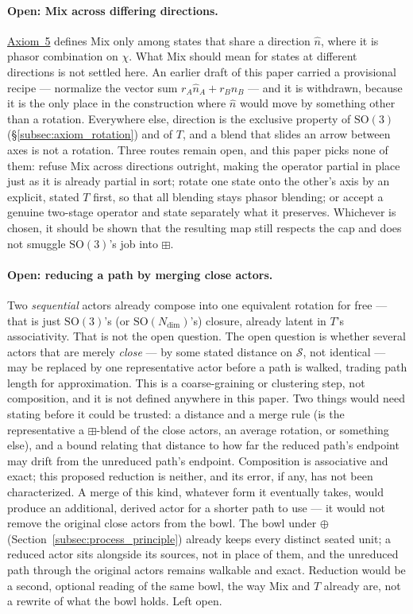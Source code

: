 \documentclass[12pt, a4paper]{article}
\begin{document}
\paragraph{Open: Mix across differing directions.}
\label{subsec:mix_scattered_open}
\hyperref[subsec:axiom_interference]{Axiom~5} defines Mix only among states
that share a direction $\hat n$, where it is phasor combination on
$\chi$. What Mix should mean for states at different directions is not
settled here. An earlier draft of this paper carried a provisional
recipe --- normalize the vector sum $r_A\hat n_A+r_B\hat n_B$ --- and
it is withdrawn, because it is the only place in the construction
where $\hat n$ would move by something other than a rotation.
Everywhere else, direction is the exclusive property of
$\mathrm{SO}(3)$ (\S\ref{subsec:axiom_rotation}) and of $T$, and a
blend that slides an arrow between axes is not a rotation. Three
routes remain open, and this paper picks none of them: refuse Mix
across directions outright, making the operator partial in place just
as it is already partial in sort; rotate one state onto the other's
axis by an explicit, stated $T$ first, so that all blending stays
phasor blending; or accept a genuine two-stage operator and state
separately what it preserves. Whichever is chosen, it should be shown
that the resulting map still respects the cap and does not smuggle
$\mathrm{SO}(3)$'s job into $\boxplus$.

\paragraph{Open: reducing a path by merging close actors.} Two
\emph{sequential} actors already compose into one equivalent rotation
for free --- that is just $\mathrm{SO}(3)$'s (or $\mathrm{SO}(N_{\mathrm{dim}})$'s)
closure, already latent in $T$'s associativity. That is not the open
question. The open question is whether several actors that are
merely \emph{close} --- by some stated distance on $\mathcal{S}$, not
identical --- may be replaced by one representative actor before a
path is walked, trading path length for approximation. This is a
coarse-graining or clustering step, not composition, and it is not
defined anywhere in this paper. Two things would need stating before
it could be trusted: a distance and a merge rule (is the
representative a $\boxplus$-blend of the close actors, an average
rotation, or something else), and a bound relating that distance to
how far the reduced path's endpoint may drift from the unreduced
path's endpoint. Composition is associative and exact;
this proposed reduction is neither, and its error, if any, has not
been characterized.
A merge of this kind, whatever form it eventually takes, would
produce an additional, derived actor for a shorter path to use --- it
would not remove the original close actors from the bowl. The bowl
under $\oplus$ (Section~\ref{subsec:process_principle}) already keeps
every distinct seated unit; a reduced actor sits alongside its
sources, not in place of them, and the unreduced path through the
original actors remains walkable and exact. Reduction would be a
second, optional reading of the same bowl, the way Mix and $T$
already are, not a rewrite of what the bowl holds. Left open.
\end{document}
